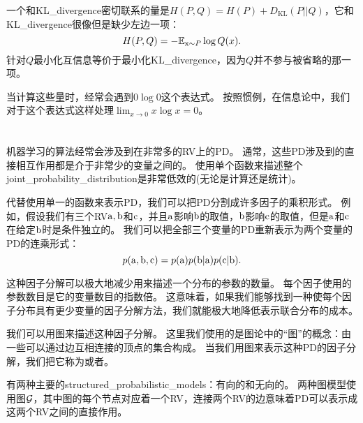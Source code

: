
一个和\gls{KL_divergence}密切联系的量是$H(P, Q) = H(P) + D_\text{KL}(P||Q)$，它和\gls{KL_divergence}很像但是缺少左边一项：
\begin{equation}
H(P, Q) = -\mathbb{E}_{\mathrm{x}\sim P} \log Q(x).
\end{equation}
针对$Q$最小化互信息等价于最小化\gls{KL_divergence}，因为$Q$并不参与被省略的那一项。

当计算这些量时，经常会遇到$0\log 0$这个表达式。
按照惯例，在信息论中，我们对于这个表达式这样处理$\lim_{x \to 0} x\log x = 0$。


\section{}
\label{sec:structured_probabilistic_models}

机器学习的算法经常会涉及到在非常多的\gls{RV}上的\gls{PD}。
通常，这些\gls{PD}涉及到的直接相互作用都是介于非常少的变量之间的。
使用单个函数来描述整个\gls{joint_probability_distribution}是非常低效的(无论是计算还是统计)。

代替使用单一的函数来表示\gls{PD}，我们可以把\gls{PD}分割成许多因子的乘积形式。
例如，假设我们有三个\gls{RV}$\mathrm{a}, \mathrm{b}$和$\mathrm{c}$，并且$\mathrm{a}$影响$\mathrm{b}$的取值，$\mathrm{b}$影响$\mathrm{c}$的取值，但是$\mathrm{a}$和$\mathrm{c}$在给定$\mathrm{b}$时是条件独立的。
我们可以把全部三个变量的\gls{PD}重新表示为两个变量的\gls{PD}的连乘形式：
\begin{equation}
p(\mathrm{a}, \mathrm{b}, \mathrm{c}) = p(\mathrm{a})p(\mathrm{b}| \mathrm{a})p(\mathrm{c}|\mathrm{b}).
\end{equation}

这种因子分解可以极大地减少用来描述一个分布的参数的数量。
每个因子使用的参数数目是它的变量数目的指数倍。
这意味着，如果我们能够找到一种使每个因子分布具有更少变量的因子分解方法，我们就能极大地降低表示联合分布的成本。

我们可以用图来描述这种因子分解。
这里我们使用的是图论中的``图''的概念：由一些可以通过边互相连接的顶点的集合构成。
当我们用图来表示这种\gls{PD}的因子分解，我们把它称为或者。

有两种主要的\gls{structured_probabilistic_models}：有向的和无向的。
两种图模型使用图$\mathcal{G}$，其中图的每个节点对应着一个\gls{RV}，连接两个\gls{RV}的边意味着\gls{PD}可以表示成这两个\gls{RV}之间的直接作用。

